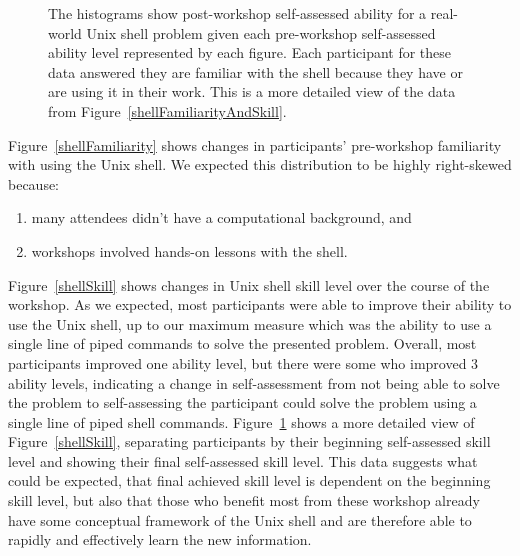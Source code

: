 \documentclass[10pt, twocolumn]{article}
\begin{document}
\begin{figure}[t]
\begin{subfigure}[c]{2.1in}
    \end{subfigure}
\caption{
  The histograms show post-workshop self-assessed ability for a real-world Unix shell problem
  given each pre-workshop self-assessed ability level represented by each figure.
  Each participant for these data answered they are familiar with the shell because they have or are using it in their work.
  This is a more detailed view of the data from Figure~\ref{shellFamiliarityAndSkill}.
\label{shellDetailSkill}}

\end{figure}

Figure~\ref{shellFamiliarity} shows changes in participants' pre-workshop familiarity with using the Unix shell.
We expected this distribution to be highly right-skewed because:

\begin{enumerate}

	\item
        many attendees didn't have a computational background, and
	
	\item
        workshops involved hands-on lessons with the shell.

\end{enumerate}

Figure~\ref{shellSkill} shows changes in Unix shell skill level over the course of the workshop.
As we expected, most participants were able to improve their ability to use the Unix shell,
up to our maximum measure
which was the ability to use a single line of piped commands to solve the presented problem.
Overall, most participants improved one ability level,
but there were some who improved 3 ability levels,
indicating a change in self-assessment from not being able to solve the problem
to self-assessing the participant could solve the problem using a single line of piped shell commands.
Figure~\ref{shellDetailSkill} shows a more detailed view of Figure~\ref{shellSkill},
separating participants by their beginning self-assessed skill level
and showing their final self-assessed skill level.
This data suggests what could be expected, 
that final achieved skill level is dependent on the beginning skill level,
but also that those who benefit most from these workshop
already have some conceptual framework of the Unix shell
and are therefore able to rapidly and effectively learn
the new information.
\end{document}
